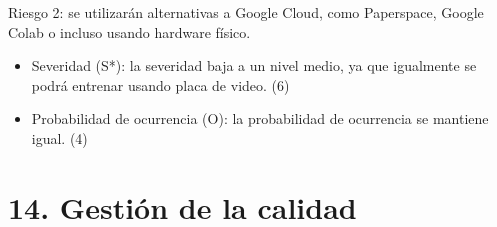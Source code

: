 \documentclass[
11pt, %
]{charter}
\begin{document}
Riesgo 2: se utilizarán alternativas a Google Cloud, como Paperspace, Google Colab o incluso usando hardware físico.
\begin{itemize}
	\item Severidad (S*): la severidad baja a un nivel medio, ya que igualmente se podrá entrenar usando placa de video. (6)
  	\item Probabilidad de ocurrencia (O): la probabilidad de ocurrencia se mantiene igual. (4)
\end{itemize}
 



\section{14. Gestión de la calidad}
\label{sec:calidad}
\end{document}
